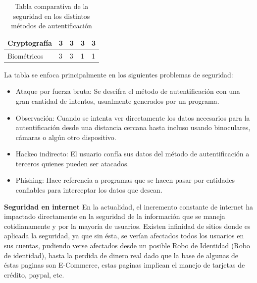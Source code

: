 \documentclass[12pt, a4paper, titlepage]{report}
\begin{document}
\begin{table}[H]
{\begin{tabular}{l|l|l|l|l|}
					\multicolumn{1}{|l|}{Cryptografía}                                                     & 3                                                                 & 3           & 3                                                          & 3        \\ \hline
					\multicolumn{1}{|l|}{Biométricos}                                                      & 3                                                                 & 3           & 1                                                          & 1        \\ \hline
				\end{tabular}
			}
			\caption[Seguridad en los métodos de autentificación]{Tabla comparativa de la seguridad en los distintos métodos de autentificaci\'on}
			\label{cuadro:VentajasMetodos}
		\end{table}
		La tabla se enfoca principalmente en los siguientes problemas de seguridad: 
		
		\begin{itemize}
			\item Ataque por fuerza bruta: Se descifra el método de autentificaci\'on con una gran cantidad de intentos, usualmente generados por un programa.
			\item Observación: Cuando se intenta ver directamente los datos necesarios para la autentificaci\'on desde una distancia cercana hasta incluso usando binoculares, cámaras o algún otro dispositivo.
			\item Hackeo indirecto: El usuario confía sus datos del método de autentificaci\'on a terceros quienes pueden ser atacados. 
			\item Phishing: Hace referencia a programas que se hacen pasar por entidades confiables para interceptar los datos que desean.
		\end{itemize}
		
	    \textbf{Seguridad en internet}
	    En la actualidad, el incremento constante de internet ha impactado directamente en la seguridad de la información que se maneja cotidianamente y por la mayoría de usuarios. Existen infinidad de sitios donde es aplicada la seguridad, ya que sin ésta, se verían afectados todos los usuarios en  sus cuentas, pudiendo verse afectados desde un posible \Gls{Robo de Identidad} (Robo de identidad), hasta la perdida de dinero real dado que la base de algunas de éstas paginas son E-Commerce, estas paginas implican el manejo de tarjetas de crédito, paypal, etc.\\
		
\end{document}
